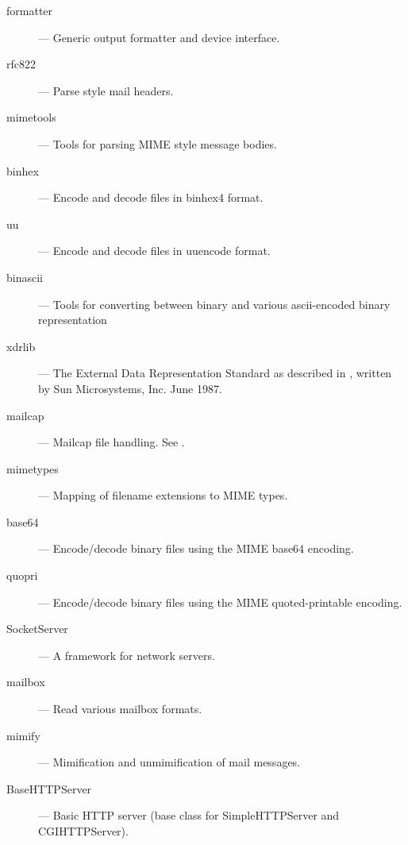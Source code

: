 \begin{description}
\item[formatter]
--- Generic output formatter and device interface.

\item[rfc822]
--- Parse  style mail headers.

\item[mimetools]
--- Tools for parsing MIME style message bodies.

\item[binhex]
--- Encode and decode files in binhex4 format.

\item[uu]
--- Encode and decode files in uuencode format.

\item[binascii]
--- Tools for converting between binary and various ascii-encoded binary 
representation

\item[xdrlib]
--- The External Data Representation Standard as described in ,
written by Sun Microsystems, Inc. June 1987.

\item[mailcap]
--- Mailcap file handling.  See .

\item[mimetypes]
--- Mapping of filename extensions to MIME types.

\item[base64]
--- Encode/decode binary files using the MIME base64 encoding.

\item[quopri]
--- Encode/decode binary files using the MIME quoted-printable encoding.

\item[SocketServer]
--- A framework for network servers.

\item[mailbox]
--- Read various mailbox formats.

\item[mimify]
--- Mimification and unmimification of mail messages.

\item[BaseHTTPServer]
--- Basic HTTP server (base class for SimpleHTTPServer and CGIHTTPServer).

\end{description}
